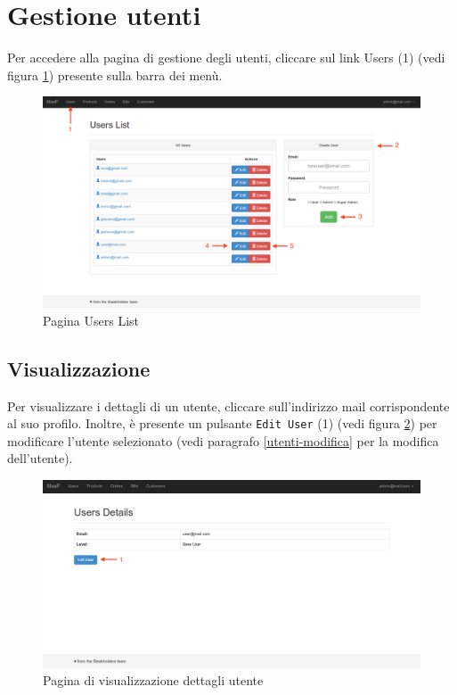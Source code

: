 \section{Gestione utenti}
\label{gestioneutenti}
Per accedere alla pagina di gestione degli utenti, cliccare sul link Users (1) (vedi figura \ref{fig:users}) presente sulla barra dei menù.

\begin{figure}[H]
	\centering \includegraphics[width=1\textwidth]{img/users.png}
	\caption{ \label{fig:users} Pagina Users List}
\end{figure}


	\subsection{Visualizzazione}
	\label{utenti-visualizzazione}
	Per visualizzare i dettagli di un utente, cliccare sull'indirizzo mail corrispondente al suo profilo. Inoltre, è presente un pulsante \texttt{Edit User} (1) (vedi figura \ref{fig:visualizzautente}) per modificare l'utente selezionato (vedi paragrafo \ref{utenti-modifica} per la modifica dell'utente).

	\begin{figure}[H]
		\centering \includegraphics[width=1\textwidth]{img/visualizza-utente.png}
		\caption{ \label{fig:visualizzautente} Pagina di visualizzazione dettagli utente}
	\end{figure}

